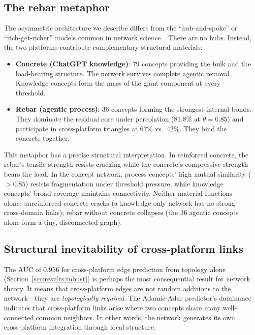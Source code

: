 \documentclass[11pt,twocolumn]{article}
\begin{document}
\subsection{The rebar metaphor}

The asymmetric architecture we describe differs from the ``hub-and-spoke'' or ``rich-get-richer'' models common in network science~\citep{barabasi1999emergence}.
There are no hubs.
Instead, the two platforms contribute complementary structural materials:

\begin{itemize}
  \item \textbf{Concrete (ChatGPT knowledge)}: 79 concepts providing the bulk and the load-bearing structure. The network survives complete agentic removal. Knowledge concepts form the mass of the giant component at every threshold.
  \item \textbf{Rebar (agentic process)}: 36 concepts forming the strongest internal bonds. They dominate the residual core under percolation ($81.8\%$ at $\theta = 0.85$) and participate in cross-platform triangles at $67\%$ vs.\ $42\%$. They bind the concrete together.
\end{itemize}

This metaphor has a precise structural interpretation.
In reinforced concrete, the rebar's tensile strength resists cracking while the concrete's compressive strength bears the load.
In the concept network, process concepts' high mutual similarity ($> 0.85$) resists fragmentation under threshold pressure, while knowledge concepts' broad coverage maintains connectivity.
Neither material functions alone: unreinforced concrete cracks (a knowledge-only network has no strong cross-domain links); rebar without concrete collapses (the 36 agentic concepts alone form a tiny, disconnected graph).

\subsection{Structural inevitability of cross-platform links}

The AUC of $0.956$ for cross-platform edge prediction from topology alone (Section~\ref{sec:results:robust}) is perhaps the most consequential result for network theory.
It means that cross-platform edges are not random additions to the network---they are \emph{topologically required}.
The Adamic-Adar predictor's dominance indicates that cross-platform links arise where two concepts share many well-connected common neighbors.
In other words, the network generates its own cross-platform integration through local structure.
\end{document}

